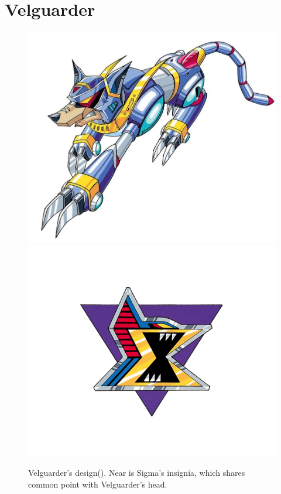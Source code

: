 \section{Velguarder}\label{boss:Velguarder}
\begin{figure}[htp]
	\centering
	\includegraphics[width=0.4\linewidth]{figures/X1/Sigma_stages/Velguarder.jpg}
	\includegraphics[width=0.4\linewidth]{figures/X1/Sigma_stages/Sigma_logo.png}
	\caption{Velguarder's design(\cite{book:MMX_Complete_art}). Near is Sigma's insignia, which shares common point with Velguarder's head.}
\end{figure}

